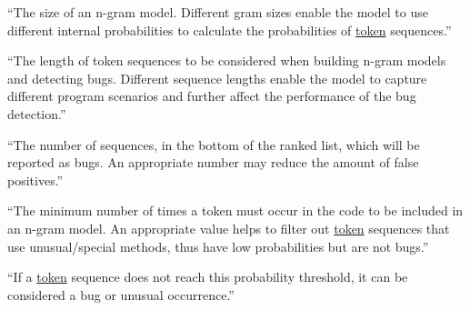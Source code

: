 \begin{definition}\label{def:gram_size}
    ``The size of an n-gram model. Different gram sizes enable the model to use different internal probabilities to calculate the probabilities of \hyperref[def:token]{token} sequences.''~\cite{bugram}
\end{definition}

\begin{definition}\label{def:sequence_length}
    ``The length of token sequences to be considered when building n-gram models and detecting bugs. Different sequence lengths enable the model to capture different program scenarios and further affect the performance of the bug detection.''~\cite{bugram}
\end{definition}

\begin{definition}\label{def:reporting_size}
    ``The number of sequences, in the bottom of the ranked list, which will be reported as bugs. An appropriate number may reduce the amount of false positives.''~\cite{bugram}
\end{definition}

\begin{definition}\label{def:minimum_token_occurrence}
    ``The minimum number of times a token must occur in the code to be included in an n-gram model. An appropriate value helps to filter out \hyperref[def:token]{token} sequences that use unusual/special methods, thus have low probabilities but are not bugs.''~\cite{bugram}
\end{definition}

\begin{definition}\label{def:probability_threshold}
    ``If a \hyperref[def:token]{token} sequence does not reach this probability threshold, it can be considered a bug or unusual occurrence.''
\end{definition}

